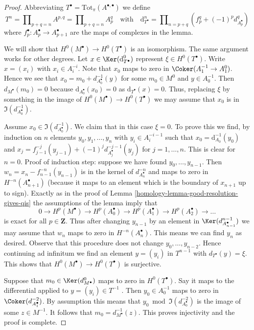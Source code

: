 \begin{proof}

Abbreviating $T^\bullet = \text{Tot}_\pi(A^{\bullet, \bullet})$
we define
$$
T^n = \prod\nolimits_{p + q = n} A^{p, q} =
\prod\nolimits_{p + q = n} A_p^q
\quad\text{with}\quad
\text{d}_{T^\bullet}^n =
\prod\nolimits_{n = p + q} (f_p^q + (-1)^pd_{A_p^\bullet}^q)
$$
where $f_p^\bullet : A_p^\bullet \to A_{p + 1}^\bullet$
are the maps of complexes in the lemma.

\medskip\noindent
We will show that $H^0(M^\bullet) \to H^0(T^\bullet)$ is an isomorphism.
The same argument works for other degrees.
Let $x \in \Ker(\text{d}_{T^\bullet}^0)$ represent $\xi \in H^0(T^\bullet)$.
Write $x = (x_i)$ with $x_i \in A_i^{-i}$.
Note that $x_0$ maps to zero in $\Coker(A_1^{-1} \to A_1^0)$.
Hence we see that $x_0 = m_0 + d_{A_0^\bullet}^{-1}(y)$ for some
$m_0 \in M^0$ and $y \in A_0^{-1}$.
Then $d_{M^\bullet}(m_0) = 0$ because $\text{d}_{A_0^\bullet}(x_0) = 0$
as $\text{d}_{T^\bullet}(x) = 0$.
Thus, replacing $\xi$ by something in the image of
$H^0(M^\bullet) \to H^0(T^\bullet)$ we may assume that $x_0$
is in $\Im(d^{-1}_{A_0^\bullet})$.

\medskip\noindent
Assume $x_0 \in \Im(d^{-1}_{A_0^\bullet})$. We claim that in this
case $\xi = 0$. To prove this we find, by induction on $n$ elements
$y_0, y_1, \ldots, y_n$ with $y_i \in A_i^{-i - 1}$ such that
$x_0 = \text{d}_{A_0}^{-1}(y_0)$ and
$x_j = f_{j - 1}^{-j}(y_{j - 1}) + (-1)^j d^{-j - 1}_{A_j^\bullet}(y_j)$
for $j = 1, \ldots, n$. This is clear for $n = 0$. Proof of induction step:
suppose we have found $y_0, \ldots, y_{n - 1}$. Then
$w_n = x_n - f_{n - 1}^{-n}(y_{n - 1})$ is in the kernel of
$d^{-n}_{A_n^\bullet}$ and maps to zero in $H^{-n}(A_{n + 1}^\bullet)$
(because it maps to an element which is the boundary
of $x_{n + 1}$ up to sign). Exactly as in the proof of
Lemma \ref{homology-lemma-good-resolution-gives-qis}
the assumptions of the lemma imply that
$$
0 \to
H^p(M^\bullet) \to
H^p(A_0^\bullet) \to
H^p(A_1^\bullet) \to
H^p(A_2^\bullet) \to \ldots
$$
is exact for all $p \in \mathbf{Z}$. Thus after changing $y_{n - 1}$
by an element in $\Ker(d^{n - 1}_{A_{n - 1}^\bullet})$ we may assume
that $w_n$ maps to zero in $H^{-n}(A_n^\bullet)$. This means we
can find $y_n$ as desired. Observe that this procedure does not
change $y_0, \ldots, y_{n - 2}$. Hence continuing ad infinitum
we find an element $y = (y_i)$ in $T^{n - 1}$ with $d_{T^\bullet}(y) = \xi$.
This shows that $H^0(M^\bullet) \to H^0(T^\bullet)$ is surjective.

\medskip\noindent
Suppose that $m_0 \in \Ker(d^0_{M^\bullet})$ maps to zero in $H^0(T^\bullet)$.
Say it maps to the differential applied to $y = (y_i) \in T^{-1}$ .
Then $y_0 \in A_0^{-1}$ maps to zero in $\Coker(d^{-2}_{A_1^\bullet})$.
By assumption this means that $y_0 \bmod \Im(d^{-2}_{A_0^\bullet})$
is the image of some $z \in M^{-1}$. It follows that
$m_0 = d^{-1}_{M^\bullet}(z)$. This proves injectivity and the proof is
complete.
\end{proof}

